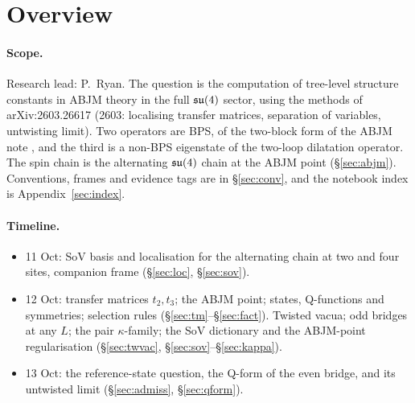 \section{Overview}\label{sec:overview}

\paragraph{Scope.} Research lead: P.~Ryan. The question is the computation of tree-level structure constants in ABJM
theory in the full $\mathfrak{su}(4)$ sector, using the methods of arXiv:2603.26617 (2603: localising transfer matrices,
separation of variables, untwisting limit). Two operators are BPS, of the two-block form of the ABJM note
, and the third is a non-BPS eigenstate of the two-loop dilatation operator. The spin chain is
the alternating $\mathfrak{su}(4)$ chain at the ABJM point (\S\ref{sec:abjm}). Conventions, frames and evidence tags are in
\S\ref{sec:conv}, and the notebook index is Appendix~\ref{sec:index}.

\paragraph{Timeline.}
\begin{itemize}
\item 11 Oct: SoV basis and localisation for the alternating chain at two and four sites, companion frame
  (\S\ref{sec:loc}, \S\ref{sec:sov}).
\item 12 Oct: transfer matrices $t_2,t_3$; the ABJM point; states, Q-functions and symmetries; selection rules
  (\S\ref{sec:tm}--\S\ref{sec:fact}). Twisted vacua; odd bridges at any $L$; the pair $\kappa$-family; the SoV
  dictionary and the ABJM-point regularisation (\S\ref{sec:twvac}, \S\ref{sec:sov}--\S\ref{sec:kappa}).
\item 13 Oct: the reference-state question, the Q-form of the even bridge, and its untwisted limit
  (\S\ref{sec:admiss}, \S\ref{sec:qform}).
\end{itemize}

